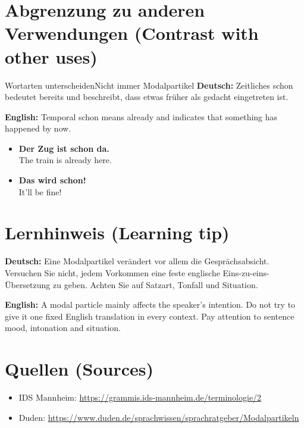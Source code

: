 \documentclass[a4paper,11pt]{article}
\newcommand{\GermanText}[1]{\textbf{Deutsch: }#1\par}
\newcommand{\EnglishText}[1]{{\small\color{SoftGray}\textbf{English: }#1\par}}
\newcommand{\ExampleItem}[2]{\item \textbf{#1}\\{\small\color{SoftGray}#2}}
\begin{document}
\section{Abgrenzung zu anderen Verwendungen \textnormal{(Contrast with other uses)}}
\begin{grammarentry}{Wortarten unterscheiden}{Nicht immer Modalpartikel}
\GermanText{Zeitliches schon bedeutet bereits und beschreibt, dass etwas früher als gedacht eingetreten ist.}
\EnglishText{Temporal schon means already and indicates that something has happened by now.}
\end{grammarentry}
\begin{exbox}\begin{itemize}
\ExampleItem{Der Zug ist schon da.}{The train is already here.}
\ExampleItem{Das wird schon!}{It'll be fine!}
\end{itemize}\end{exbox}
\section{Lernhinweis \textnormal{(Learning tip)}}
\GermanText{Eine Modalpartikel verändert vor allem die Gesprächsabsicht. Versuchen Sie nicht, jedem Vorkommen eine feste englische Eins-zu-eins-Übersetzung zu geben. Achten Sie auf Satzart, Tonfall und Situation.}
\EnglishText{A modal particle mainly affects the speaker's intention. Do not try to give it one fixed English translation in every context. Pay attention to sentence mood, intonation and situation.}
\section{Quellen \textnormal{(Sources)}}
\begin{itemize}
\item IDS Mannheim: \url{https://grammis.ids-mannheim.de/terminologie/2}
\item Duden: \url{https://www.duden.de/sprachwissen/sprachratgeber/Modalpartikeln}
\end{itemize}
\end{document}
